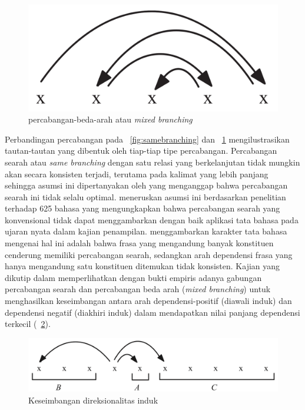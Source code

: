 \begin{figure}
	\centering \includegraphics[width=0.5
	\textwidth] {pics/mixedbranching.png} \caption{\Gls{percabangan-beda-arah} atau \textit{mixed branching}} 
\label{fig:mixedbranching} \end{figure}

Perbandingan percabangan pada \pic~\ref{fig:samebranching} dan \pic~\ref{fig:mixedbranching} mengilustrasikan tautan-tautan yang dibentuk oleh tiap-tiap tipe percabangan. Percabangan searah atau \textit{same branching} dengan satu relasi yang berkelanjutan tidak mungkin akan secara konsisten terjadi, terutama pada kalimat yang lebih panjang sehingga asumsi ini dipertanyakan oleh \cite{temperley2008dependency} yang menganggap bahwa percabangan searah ini tidak selalu optimal. \cite{temperley2008dependency} meneruskan asumsi ini berdasarkan penelitian \cite{dryer1992greenbergian} terhadap 625 bahasa yang mengungkapkan bahwa percabangan searah yang konvensional tidak dapat menggambarkan dengan baik aplikasi tata bahasa pada ujaran nyata dalam kajian penampilan. \cite{dryer1992greenbergian} menggambarkan karakter tata bahasa mengenai hal ini adalah bahwa frasa yang mengandung banyak konstituen cenderung memiliki percabangan searah, sedangkan arah dependensi frasa yang hanya mengandung satu konstituen ditemukan tidak konsisten. Kajian \cite{dryer1992greenbergian} yang dikutip dalam \cite{gildea2010grammars} memperlihatkan dengan bukti empiris adanya gabungan percabangan searah dan percabangan beda arah (\textit{mixed branching}) untuk menghasilkan keseimbangan antara arah dependensi-positif (diawali induk) dan dependensi negatif (diakhiri induk) dalam mendapatkan nilai panjang dependensi terkecil (\pic~\ref{fig:balancedbranching}).

\begin{figure}
	\centering \includegraphics[width=0.8
	\textwidth] {pics/balancedbranching.png} \caption{Keseimbangan direksionalitas induk} 
\label{fig:balancedbranching} \end{figure}

